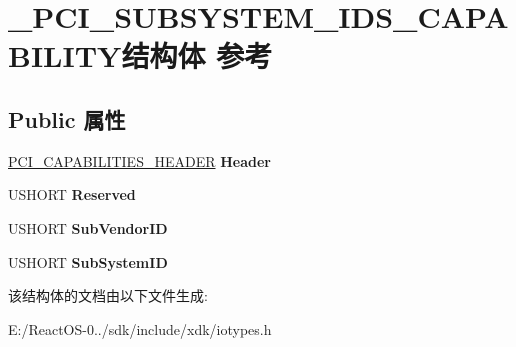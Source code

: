 \hypertarget{struct___p_c_i___s_u_b_s_y_s_t_e_m___i_d_s___c_a_p_a_b_i_l_i_t_y}{}\section{\+\_\+\+P\+C\+I\+\_\+\+S\+U\+B\+S\+Y\+S\+T\+E\+M\+\_\+\+I\+D\+S\+\_\+\+C\+A\+P\+A\+B\+I\+L\+I\+T\+Y结构体 参考}
\label{struct___p_c_i___s_u_b_s_y_s_t_e_m___i_d_s___c_a_p_a_b_i_l_i_t_y}
\subsection*{Public 属性}
\begin{DoxyCompactItemize}
\item 
\mbox{\label{struct___p_c_i___s_u_b_s_y_s_t_e_m___i_d_s___c_a_p_a_b_i_l_i_t_y_aed899ac171afff00862208831edf9d73}} 
\hyperlink{struct___p_c_i___c_a_p_a_b_i_l_i_t_i_e_s___h_e_a_d_e_r}{P\+C\+I\+\_\+\+C\+A\+P\+A\+B\+I\+L\+I\+T\+I\+E\+S\+\_\+\+H\+E\+A\+D\+ER} {\bfseries Header}
\item 
\mbox{\label{struct___p_c_i___s_u_b_s_y_s_t_e_m___i_d_s___c_a_p_a_b_i_l_i_t_y_aebd9deafb6d4a15d78314e3cbf80bca7}} 
U\+S\+H\+O\+RT {\bfseries Reserved}
\item 
\mbox{\label{struct___p_c_i___s_u_b_s_y_s_t_e_m___i_d_s___c_a_p_a_b_i_l_i_t_y_aba04229777f15ef5903aea204f469b5c}} 
U\+S\+H\+O\+RT {\bfseries Sub\+Vendor\+ID}
\item 
\mbox{\label{struct___p_c_i___s_u_b_s_y_s_t_e_m___i_d_s___c_a_p_a_b_i_l_i_t_y_a17468aad2ff234588ba0065924099fd2}} 
U\+S\+H\+O\+RT {\bfseries Sub\+System\+ID}
\end{DoxyCompactItemize}


该结构体的文档由以下文件生成\+:\begin{DoxyCompactItemize}
\item 
E\+:/\+React\+O\+S-\/0../sdk/include/xdk/iotypes.\+h\end{DoxyCompactItemize}
